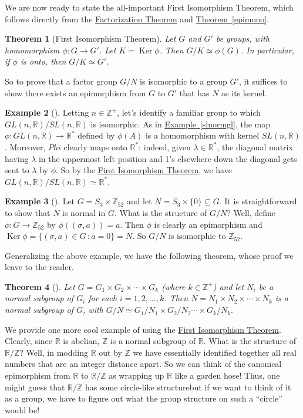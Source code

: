 \documentclass[10pt,]{book}
\theoremstyle{plain}
\newtheorem{theorem}{Theorem}[section]
\theoremstyle{definition}
\theoremstyle{definition}
\theoremstyle{definition}
\newtheorem{example}[theorem]{Example}
\theoremstyle{definition}
\numberwithin{equation}{section}
\def\Z{\mathbb{Z}}
\def\R{\mathbb{R}}
\DeclareMathOperator{\Ker}{Ker}
\begin{document}
We are now ready to state the all-important First Isomorphism Theorem, which follows directly from the \hyperref[facthm]{Factorization Theorem}  and \hyperref[epimono]{Theorem~\ref{epimono}}.%
\begin{theorem}[{First Isomorphism Theorem}]\label{fit}
Let \(G\) and \(G'\) be groups, with homomorphism \(\phi:G \rightarrow G'\). Let \(K=\Ker
\phi\). Then \(G/K \simeq \phi(G)\). In particular, if \(\phi\) is onto, then \(G/K\simeq G'\).%
\end{theorem}
So to prove that a factor group \(G/N\) is isomorphic to a group \(G'\), it suffices to show there exists an epimorphism from \(G\) to \(G'\) that has \(N\) as its kernel.%
\begin{example}[]\label{example-86}
Letting \(n\in \Z^+\), let's identify a familiar group to which \(GL(n,\R)/SL(n,\R)\) is isomorphic. As in \hyperref[slnormgl]{Example~\ref{slnormgl}}, the map \(\phi:GL(n,\R)\to \R^*\) defined by \(\phi(A)\) is a homomorphism with kernel \(SL(n,\R)\). Moreover, \(Phi\) clearly maps onto \(\R^*\): indeed, given \(\lambda \in
\R^*\), the diagonal matrix having \(\lambda\) in the uppermost left position and 1's elsewhere down the diagonal gets sent to \(\lambda\) by \(\phi\). So by the \hyperref[fit]{First Isomorphism Theorem}, we have \(GL(n,\R)/SL(n,\R) \simeq \R^*\).%
\end{example}
\begin{example}[]\label{example-87}
Let \(G=S_3\times \Z_{52}\) and let \(N=S_3 \times
\{0\}\subseteq G\). It is straightforward to show that \(N\) is normal in \(G\). What is the structure of \(G/N\)? Well, define \(\phi:G\to
\Z_{52}\) by \(\phi((\sigma, a))=a\). Then \(\phi\) is clearly an epimorphism and \(\Ker \phi=\{(\sigma,a)\in G\,:a=0\}=N\). So \(G/N\) is isomorphic to \(\Z_{52}\).%
\end{example}
Generalizing the above example, we have the following theorem, whose proof we leave to the reader.%
\begin{theorem}[{}]\label{theorem-67}
Let \(G=G_1\times G_2 \times \cdots \times G_k\) (where \(k\in \Z^+\)) and let \(N_i\) be a normal subgroup of \(G_i\) for each \(i=1,2,\ldots, k\). Then \(N=N_1 \times N_2 \times \cdots \times N_k\) is a normal subgroup of \(G\), with \(G/N \simeq G_1/N_1 \times G_2/N_2
\cdots \times G_k/N_k.\)%
\end{theorem}
We provide one more cool example of using the \hyperref[fit]{First Isomorphism Theorem}. Clearly, since \(\R\) is abelian, \(\Z\) is a normal subgroup of \(\R\). What is the structure of \(\R/\Z\)? Well, in modding \(\R\) out by \(\Z\) we have essentially identified together all real numbers that are an integer distance apart. So we can think of the canonical epimorphism from \(\R\) to \(\R/\Z\) as wrapping up \(\R\) like a garden hose! Thus, one might guess that \(\R/\Z\) has some circle-like structure\textemdash{}but if we want to think of it as a group, we have to figure out what the group structure on such a ``circle'' would be!%
\end{document}
